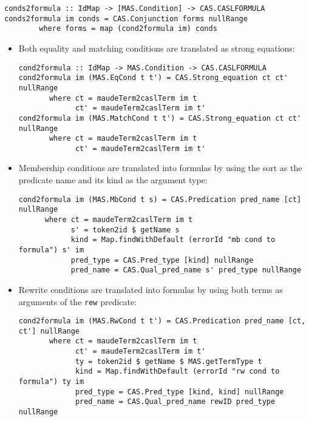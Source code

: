 {\codesize
\begin{verbatim}
conds2formula :: IdMap -> [MAS.Condition] -> CAS.CASLFORMULA
conds2formula im conds = CAS.Conjunction forms nullRange
        where forms = map (cond2formula im) conds
\end{verbatim}
}

\begin{itemize}

\item Both equality and matching conditions are translated as
strong equations:

{\codesize
\begin{verbatim}
cond2formula :: IdMap -> MAS.Condition -> CAS.CASLFORMULA
cond2formula im (MAS.EqCond t t') = CAS.Strong_equation ct ct' nullRange
       where ct = maudeTerm2caslTerm im t
             ct' = maudeTerm2caslTerm im t'
cond2formula im (MAS.MatchCond t t') = CAS.Strong_equation ct ct' nullRange
       where ct = maudeTerm2caslTerm im t
             ct' = maudeTerm2caslTerm im t'
\end{verbatim}
}

\item Membership conditions are translated into formulas by using the sort
as the predicate name and its kind as the argument type:

{\codesize
\begin{verbatim}
cond2formula im (MAS.MbCond t s) = CAS.Predication pred_name [ct] nullRange
      where ct = maudeTerm2caslTerm im t
            s' = token2id $ getName s
            kind = Map.findWithDefault (errorId "mb cond to formula") s' im
            pred_type = CAS.Pred_type [kind] nullRange
            pred_name = CAS.Qual_pred_name s' pred_type nullRange
\end{verbatim}
}

\item Rewrite conditions are translated into formulas by using both terms
as arguments of the \verb"rew" predicate: 

{\codesize
\begin{verbatim}
cond2formula im (MAS.RwCond t t') = CAS.Predication pred_name [ct, ct'] nullRange
       where ct = maudeTerm2caslTerm im t
             ct' = maudeTerm2caslTerm im t'
             ty = token2id $ getName $ MAS.getTermType t
             kind = Map.findWithDefault (errorId "rw cond to formula") ty im
             pred_type = CAS.Pred_type [kind, kind] nullRange
             pred_name = CAS.Qual_pred_name rewID pred_type nullRange
\end{verbatim}
}

\end{itemize}

